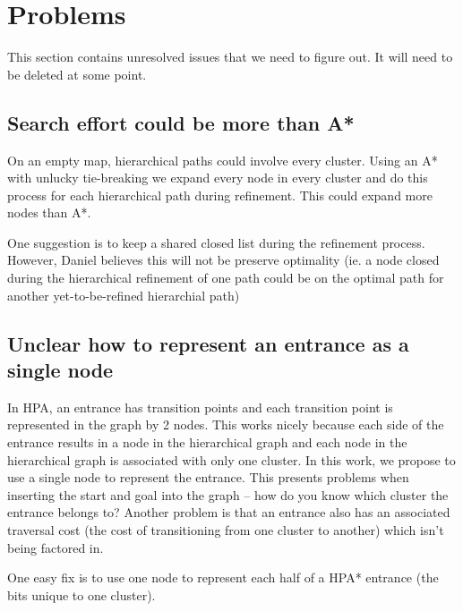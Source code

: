 \section{Problems}
This section contains unresolved issues that we need to figure out.
It will need to be deleted at some point.
\subsection{Search effort could be more than A*}
On an empty map, hierarchical paths could involve every cluster. 
Using an A* with unlucky tie-breaking we expand every node in every cluster and do this process for each hierarchical path during refinement. 
This could expand more nodes than A*.
\par
One suggestion is to keep a shared closed list during the refinement process. 
However, Daniel believes this will not be preserve optimality (ie. a node closed during the hierarchical refinement of one path could be on the optimal path for another yet-to-be-refined hierarchial path)

\subsection{Unclear how to represent an entrance as a single node}
In HPA, an entrance has transition points and each transition point is represented in the graph by 2 nodes.
This works nicely because each side of the entrance results in a node in the hierarchical graph and each node in the hierarchical graph is associated with only one cluster.
In this work, we propose to use a single node to represent the entrance. 
This presents problems when inserting the start and goal into the graph -- how do you know which cluster the entrance belongs to? 
Another problem is that an entrance also has an associated traversal cost (the cost of transitioning from one cluster to another) which isn't being factored in.
\par
One easy fix is to use one node to represent each half of a HPA* entrance (the bits unique to one cluster).
